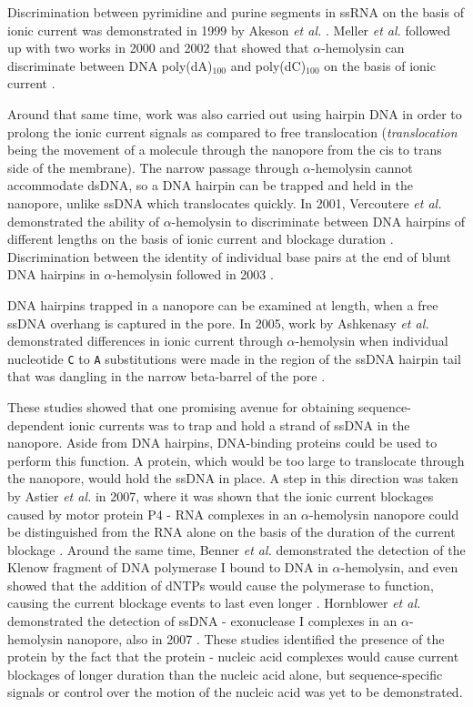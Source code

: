 Discrimination between pyrimidine and purine segments in ssRNA on the basis of ionic current was demonstrated in 1999 by Akeson \textit{et al.} \citep{Akeson1999}.  Meller \textit{et al.} followed up with two works in 2000 and 2002 that showed that $\alpha$-hemolysin can discriminate between DNA poly(dA)$_{100}$ and poly(dC)$_{100}$ on the basis of ionic current \citep{Meller2000, Meller2002}.

Around that same time, work was also carried out using hairpin DNA in order to prolong the ionic current signals as compared to free translocation (\textit{translocation} being the movement of a molecule through the nanopore from the cis to trans side of the membrane).  The narrow passage through $\alpha$-hemolysin cannot accommodate dsDNA, so a DNA hairpin can be trapped and held in the nanopore, unlike ssDNA which translocates quickly.  In 2001, Vercoutere \textit{et al.} demonstrated the ability of $\alpha$-hemolysin to discriminate between DNA hairpins of different lengths on the basis of ionic current and blockage duration \citep{Vercoutere2001}.  Discrimination between the identity of individual base pairs at the end of blunt DNA hairpins in $\alpha$-hemolysin followed in 2003 \citep{Vercoutere2003}.

DNA hairpins trapped in a nanopore can be examined at length, when a free ssDNA overhang is captured in the pore.  In 2005, work by Ashkenasy \textit{et al.} demonstrated differences in ionic current through $\alpha$-hemolysin when individual nucleotide \texttt{C} to \texttt{A} substitutions were made in the region of the ssDNA hairpin tail that was dangling in the narrow beta-barrel of the pore \citep{Ashkenasy2005}.

These studies showed that one promising avenue for obtaining sequence-dependent ionic currents was to trap and hold a strand of ssDNA in the nanopore.  Aside from DNA hairpins, DNA-binding proteins could be used to perform this function.  A protein, which would be too large to translocate through the nanopore, would hold the ssDNA in place.  A step in this direction was taken by Astier \textit{et al.} in 2007, where it was shown that the ionic current blockages caused by motor protein P4 - RNA complexes in an $\alpha$-hemolysin nanopore could be distinguished from the RNA alone on the basis of the duration of the current blockage \citep{Astier2007}.  Around the same time, Benner \textit{et al.} demonstrated the detection of the Klenow fragment of DNA polymerase I bound to DNA in $\alpha$-hemolysin, and even showed that the addition of dNTPs would cause the polymerase to function, causing the current blockage events to last even longer \citep{Benner2007}.  Hornblower \textit{et al.} demonstrated the detection of ssDNA - exonuclease I complexes in an $\alpha$-hemolysin nanopore, also in 2007 \citep{Hornblower2007}.  These studies identified the presence of the protein by the fact that the protein - nucleic acid complexes would cause current blockages of longer duration than the nucleic acid alone, but sequence-specific signals or control over the motion of the nucleic acid was yet to be demonstrated.

